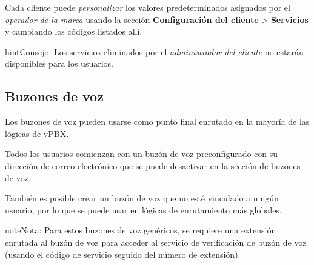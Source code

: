 \documentclass[letterpaper,10pt,spanish]{sphinxmanual}
\begin{document}
Cada cliente puede \emph{personalizar} los valores predeterminados asignados por el \emph{operador de la marca} usando la sección \textbf{Configuración del cliente} \textgreater{} \textbf{Servicios} y cambiando los códigos listados allí.

\begin{notice}{hint}{Consejo:}
Los servicios eliminados por el \emph{administrador del cliente} no estarán disponibles para los usuarios.
\end{notice}


\subsection{Buzones de voz}
\label{administration_portal/client/vpbx/voicemails:voicemails}\label{administration_portal/client/vpbx/voicemails::doc}\label{administration_portal/client/vpbx/voicemails:id1}
Los buzones de voz pueden usarse como punto final enrutado en la mayoría de las lógicas de vPBX.

Todos los usuarios comienzan con un buzón de voz preconfigurado con su dirección de correo electrónico que se puede desactivar en la sección de buzones de voz.

También es posible crear un buzón de voz que no esté vinculado a ningún usuario, por lo que se puede usar en lógicas de enrutamiento más globales.

\begin{notice}{note}{Nota:}
Para estos buzones de voz genéricos, se requiere una extensión enrutada al buzón de voz para acceder al servicio de verificación de buzón de voz (usando el código de servicio seguido del número de extensión).
\end{notice}
\end{document}
